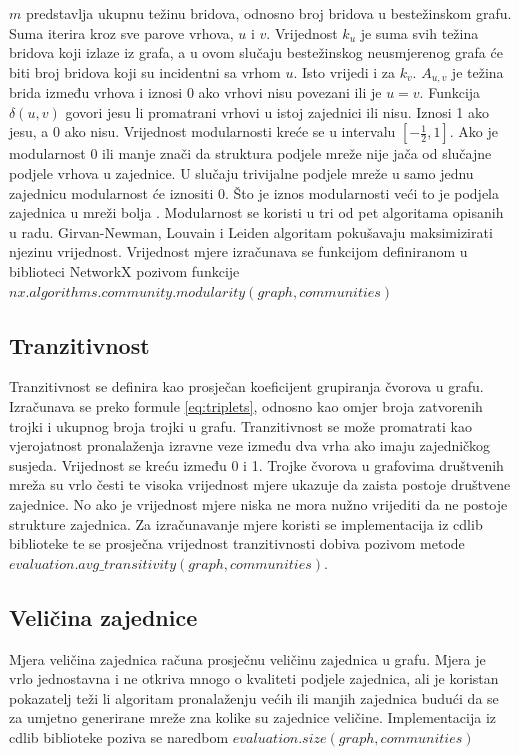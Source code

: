 $m$ predstavlja ukupnu težinu bridova, odnosno broj bridova u bestežinskom grafu. Suma iterira kroz sve parove vrhova, $u$ i $v$. Vrijednost $k_{u}$ je suma svih težina bridova koji izlaze iz grafa, a u ovom slučaju bestežinskog neusmjerenog grafa će biti broj bridova koji su incidentni sa vrhom $u$. Isto vrijedi i za $k_{v}$. $A_{u,v}$ je težina brida između vrhova i iznosi 0 ako vrhovi nisu povezani ili je $u=v$. Funkcija $\delta(u,v)$ govori jesu li promatrani vrhovi u istoj zajednici ili nisu. Iznosi 1 ako jesu, a 0 ako nisu. Vrijednost modularnosti kreće se u intervalu $[ -\frac{1}{2}, 1 ]$. Ako je modularnost 0 ili manje znači da struktura podjele mreže nije jača od slučajne podjele vrhova u zajednice. U slučaju trivijalne podjele mreže u samo jednu zajednicu modularnost će iznositi 0. Što je iznos modularnosti veći to je podjela zajednica u mreži bolja \cite{brandes2007modularity}. Modularnost se koristi u tri od pet algoritama opisanih u radu. Girvan-Newman, Louvain i Leiden algoritam pokušavaju maksimizirati njezinu vrijednost. Vrijednost mjere izračunava se funkcijom definiranom u biblioteci NetworkX pozivom funkcije $nx.algorithms.community.modularity(graph, communities)$



\subsection{Tranzitivnost}
Tranzitivnost se definira kao prosječan koeficijent grupiranja čvorova u grafu. Izračunava se preko formule \ref{eq:triplets}, odnosno kao omjer broja zatvorenih trojki i ukupnog broja trojki u grafu. Tranzitivnost se može promatrati kao vjerojatnost pronalaženja izravne veze između dva vrha ako imaju zajedničkog susjeda. Vrijednost se kreću između 0 i 1. Trojke čvorova u grafovima društvenih mreža su vrlo česti te visoka vrijednost mjere ukazuje da zaista postoje društvene zajednice. No ako je vrijednost mjere niska ne mora nužno vrijediti da ne postoje strukture zajednica. Za izračunavanje mjere koristi se implementacija iz cdlib biblioteke te se prosječna vrijednost tranzitivnosti dobiva pozivom metode $evaluation.avg\_transitivity(graph, communities)$.


\subsection{Veličina zajednice}
Mjera veličina zajednica računa prosječnu veličinu zajednica u grafu. Mjera je vrlo jednostavna i ne otkriva mnogo o kvaliteti podjele zajednica, ali je koristan pokazatelj teži li algoritam pronalaženju većih ili manjih zajednica budući da se za umjetno generirane mreže zna kolike su zajednice veličine. Implementacija iz cdlib biblioteke poziva se naredbom $evaluation.size(graph,communities)$

